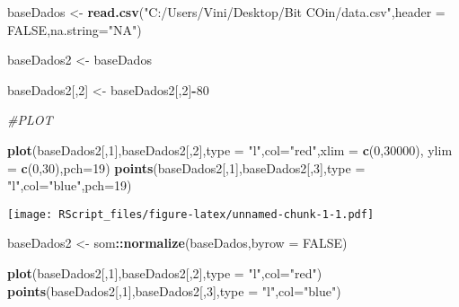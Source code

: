 \documentclass[]{article}
\newenvironment{Shaded}{\begin{snugshade}}{\end{snugshade}}
\newcommand{\KeywordTok}[1]{\textcolor[rgb]{0.13,0.29,0.53}{\textbf{#1}}}
\newcommand{\DataTypeTok}[1]{\textcolor[rgb]{0.13,0.29,0.53}{#1}}
\newcommand{\DecValTok}[1]{\textcolor[rgb]{0.00,0.00,0.81}{#1}}
\newcommand{\StringTok}[1]{\textcolor[rgb]{0.31,0.60,0.02}{#1}}
\newcommand{\CommentTok}[1]{\textcolor[rgb]{0.56,0.35,0.01}{\textit{#1}}}
\newcommand{\OtherTok}[1]{\textcolor[rgb]{0.56,0.35,0.01}{#1}}
\newcommand{\OperatorTok}[1]{\textcolor[rgb]{0.81,0.36,0.00}{\textbf{#1}}}
\newcommand{\NormalTok}[1]{#1}
\begin{document}
\begin{Shaded}
\begin{Highlighting}[]
\NormalTok{baseDados <-}\StringTok{ }\KeywordTok{read.csv}\NormalTok{(}\StringTok{"C:/Users/Vini/Desktop/Bit COin/data.csv"}\NormalTok{,}\DataTypeTok{header =} \OtherTok{FALSE}\NormalTok{,}\DataTypeTok{na.string=}\StringTok{"NA"}\NormalTok{)}


\NormalTok{baseDados2 <-}\StringTok{ }\NormalTok{baseDados}


\NormalTok{baseDados2[,}\DecValTok{2}\NormalTok{] <-}\StringTok{ }\NormalTok{baseDados2[,}\DecValTok{2}\NormalTok{]}\OperatorTok{-}\DecValTok{80}



\CommentTok{#PLOT}

\KeywordTok{plot}\NormalTok{(baseDados2[,}\DecValTok{1}\NormalTok{],baseDados2[,}\DecValTok{2}\NormalTok{],}\DataTypeTok{type =} \StringTok{"l"}\NormalTok{,}\DataTypeTok{col=}\StringTok{"red"}\NormalTok{,}\DataTypeTok{xlim =} \KeywordTok{c}\NormalTok{(}\DecValTok{0}\NormalTok{,}\DecValTok{30000}\NormalTok{), }\DataTypeTok{ylim =} \KeywordTok{c}\NormalTok{(}\DecValTok{0}\NormalTok{,}\DecValTok{30}\NormalTok{),}\DataTypeTok{pch=}\DecValTok{19}\NormalTok{)}
\KeywordTok{points}\NormalTok{(baseDados2[,}\DecValTok{1}\NormalTok{],baseDados2[,}\DecValTok{3}\NormalTok{],}\DataTypeTok{type =} \StringTok{"l"}\NormalTok{,}\DataTypeTok{col=}\StringTok{"blue"}\NormalTok{,}\DataTypeTok{pch=}\DecValTok{19}\NormalTok{)}
\end{Highlighting}
\end{Shaded}

\texttt{[image: RScript\_files/figure-latex/unnamed-chunk-1-1.pdf]}

\begin{Shaded}
\begin{Highlighting}[]
\NormalTok{baseDados2 <-}\StringTok{ }\NormalTok{som}\OperatorTok{::}\KeywordTok{normalize}\NormalTok{(baseDados,}\DataTypeTok{byrow =} \OtherTok{FALSE}\NormalTok{)}

\KeywordTok{plot}\NormalTok{(baseDados2[,}\DecValTok{1}\NormalTok{],baseDados2[,}\DecValTok{2}\NormalTok{],}\DataTypeTok{type =} \StringTok{"l"}\NormalTok{,}\DataTypeTok{col=}\StringTok{"red"}\NormalTok{)}
\KeywordTok{points}\NormalTok{(baseDados2[,}\DecValTok{1}\NormalTok{],baseDados2[,}\DecValTok{3}\NormalTok{],}\DataTypeTok{type =} \StringTok{"l"}\NormalTok{,}\DataTypeTok{col=}\StringTok{"blue"}\NormalTok{)}
\end{Highlighting}
\end{Shaded}
\end{document}
